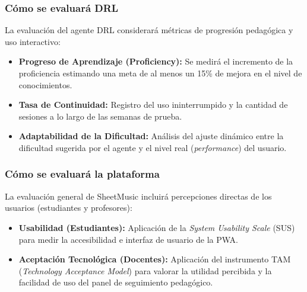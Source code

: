 \subsubsection{Cómo se evaluará DRL}
La evaluación del agente DRL considerará métricas de progresión pedagógica y uso interactivo:
\begin{itemize}
    \item \textbf{Progreso de Aprendizaje (Proficiency):} Se medirá el incremento de la proficiencia estimando una meta de al menos un 15\% de mejora en el nivel de conocimientos.
    \item \textbf{Tasa de Continuidad:} Registro del uso ininterrumpido y la cantidad de sesiones a lo largo de las semanas de prueba.
    \item \textbf{Adaptabilidad de la Dificultad:} Análisis del ajuste dinámico entre la dificultad sugerida por el agente y el nivel real (\textit{performance}) del usuario.
\end{itemize}

\subsubsection{Cómo se evaluará la plataforma}
La evaluación general de SheetMusic incluirá percepciones directas de los usuarios (estudiantes y profesores):
\begin{itemize}
    \item \textbf{Usabilidad (Estudiantes):} Aplicación de la \textit{System Usability Scale} (SUS) para medir la accesibilidad e interfaz de usuario de la PWA.
    \item \textbf{Aceptación Tecnológica (Docentes):} Aplicación del instrumento TAM (\textit{Technology Acceptance Model}) para valorar la utilidad percibida y la facilidad de uso del panel de seguimiento pedagógico.
\end{itemize}